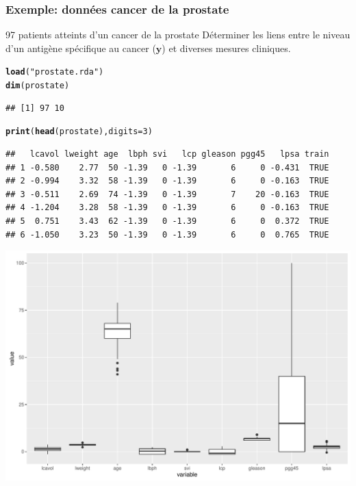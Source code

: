 \documentclass{beamer}\usepackage[]{graphicx}\usepackage[]{color}
\makeatletter
\newcommand{\hlnum}[1]{\textcolor[rgb]{0.686,0.059,0.569}{#1}}%
\newcommand{\hlstr}[1]{\textcolor[rgb]{0.192,0.494,0.8}{#1}}%
\newcommand{\hlstd}[1]{\textcolor[rgb]{0.345,0.345,0.345}{#1}}%
\newcommand{\hlkwc}[1]{\textcolor[rgb]{0.333,0.667,0.333}{#1}}%
\newcommand{\hlkwd}[1]{\textcolor[rgb]{0.737,0.353,0.396}{\textbf{#1}}}%
\newenvironment{kframe}{%
 \def\at@end@of@kframe{}%
 \ifinner\ifhmode%
  \def\at@end@of@kframe{\end{minipage}}%
  \begin{minipage}{\columnwidth}%
 \fi\fi%
 \def\FrameCommand##1{\hskip\@totalleftmargin \hskip-\fboxsep
 \colorbox{shadecolor}{##1}\hskip-\fboxsep
     \hskip-\linewidth \hskip-\@totalleftmargin \hskip\columnwidth}%
 \MakeFramed {\advance\hsize-\width
   \@totalleftmargin\z@ \linewidth\hsize
   \@setminipage}}%
 {\par\unskip\endMakeFramed%
 \at@end@of@kframe}
\newenvironment{knitrout}{}{} %
\makeatother
\begin{document}
\begin{frame}
  \frametitle{Exemple: données cancer de la prostate}

  \begin{block}{97 patients atteints d'un cancer de la prostate}
    Déterminer les liens entre le niveau d'un antigène spécifique au cancer ($\mathbf{y}$) et diverses mesures cliniques.
  \end{block}

\begin{knitrout}\scriptsize
{}\color{fgcolor}\begin{kframe}
\begin{alltt}
\hlkwd{load}\hlstd{(}\hlstr{"prostate.rda"}\hlstd{)}
\hlkwd{dim}\hlstd{(prostate)}
\end{alltt}
\begin{verbatim}
## [1] 97 10
\end{verbatim}
\begin{alltt}
\hlkwd{print}\hlstd{(}\hlkwd{head}\hlstd{(prostate),} \hlkwc{digits}\hlstd{=}\hlnum{3}\hlstd{)}
\end{alltt}
\begin{verbatim}
##   lcavol lweight age  lbph svi   lcp gleason pgg45   lpsa train
## 1 -0.580    2.77  50 -1.39   0 -1.39       6     0 -0.431  TRUE
## 2 -0.994    3.32  58 -1.39   0 -1.39       6     0 -0.163  TRUE
## 3 -0.511    2.69  74 -1.39   0 -1.39       7    20 -0.163  TRUE
## 4 -1.204    3.28  58 -1.39   0 -1.39       6     0 -0.163  TRUE
## 5  0.751    3.43  62 -1.39   0 -1.39       6     0  0.372  TRUE
## 6 -1.050    3.23  50 -1.39   0 -1.39       6     0  0.765  TRUE
\end{verbatim}
\end{kframe}
\end{knitrout}

\begin{knitrout}\scriptsize
{}\color{fgcolor}
\includegraphics[width=\textwidth]{figures/olsunnamed-chunk-11-1} 

\end{knitrout}

\end{frame}
\end{document}

